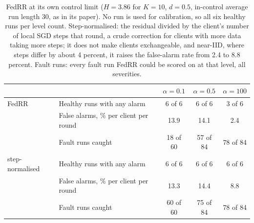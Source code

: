 \begin{table}[t]
\centering
\small
\begin{tabular}{llccc}
\toprule
 & & $\alpha = 0.1$ & $\alpha = 0.5$ & $\alpha = 100$ \\
\midrule
FedRR & Healthy runs with any alarm & 6 of 6 & 6 of 6 & 3 of 6 \\
 & False alarms, \% per client per round & 13.9 & 14.1 & 2.4 \\
 & Fault runs caught & 18 of 60 & 57 of 84 & 78 of 84 \\
\addlinespace
step-normalised & Healthy runs with any alarm & 6 of 6 & 6 of 6 & 6 of 6 \\
 & False alarms, \% per client per round & 13.3 & 14.4 & 8.8 \\
 & Fault runs caught & 60 of 60 & 75 of 84 & 78 of 84 \\
\bottomrule
\end{tabular}
\caption{FedRR at its own control limit ($H = 3.86$ for $K = 10$, $d = 0.5$, in-control average run length 30, as in its paper). No run is used for calibration, so all six healthy runs per level count. Step-normalised: the residual divided by the client's number of local SGD steps that round, a crude correction for clients with more data taking more steps; it does not make clients exchangeable, and near-IID, where steps differ by about 4 percent, it raises the false-alarm rate from 2.4 to 8.8 percent. Fault runs: every fault run FedRR could be scored on at that level, all severities.}
\label{tab:fedrr}
\end{table}
